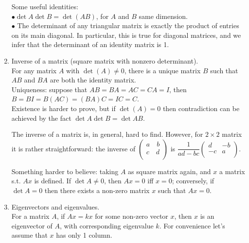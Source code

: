 \documentclass[11pt,a4paper]{article}
\begin{document}
\begin{enumerate}
Some useful identities:\\
$\bullet \det A\det B=\det (AB)$, for $A$ and $B$ same dimension.\\
$\bullet$ The determinant of any triangular matrix is exactly the product of entries on its main diagonal. In particular, this is true for diagonal matrices, and we infer that the determinant of an identity matrix is 1.

\item Inverse of a matrix (square matrix with nonzero determinant).\\
For any matrix $A$ with $\det (A)\neq 0$, there is a unique matrix $B$ such that $AB$ and $BA$ are both the identity matrix.\\
Uniqueness: suppose that $AB=BA=AC=CA=I$, then $B=BI=B(AC)=(BA)C=IC=C$.\\
Existence is harder to prove, but if $\det (A)=0$ then contradiction can be achieved by the fact $\det A\det B=\det AB$.

The inverse of a matrix is, in general, hard to find. However, for $2\times 2$ matrix it is rather straightforward: the inverse of $\left(\begin{array}{cc}
a\quad b\\
c\quad d\\
\end{array}\right)$ is $\dfrac{1}{ad-bc}\left(\begin{array}{cc}
d & -b\\
-c & a\\
\end{array}\right)$.

Something harder to believe: taking $A$ as square matrix again, and $x$ a matrix s.t. $Ax$ is defined. If $\det A\neq 0$, then $Ax=0$ iff $x=0$; conversely, if $\det A=0$ then there exists a non-zero matrix $x$ such that $Ax=0$.

\item Eigenvectors and eigenvalues.\\
For a matrix $A$, if $Ax=kx$ for some non-zero vector $x$, then $x$ is an eigenvector of $A$, with corresponding eigenvalue $k$. For convenience let's assume that $x$ has only 1 column.


\end{enumerate}
\end{document}
